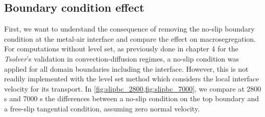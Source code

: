 
\subsection{Boundary condition effect}

First, we want to understand the consequence of removing the no-slip boundary condition at the metal-air interface and compare the effect on macrosegregation. 
For computations without level set, as previously done in chapter 4 for the \emph{Tsolver}'s validation in convection-diffusion regimes, a no-slip condition was applied for all domain boundaries including 
the interface.
However, this is not readily implemented with the level set method which considers the local interface velocity for its transport.
In \cref{fig:slipbc_2800,fig:slipbc_7000}, we compare at 2800 s and 7000 s the differences between a no-slip condition on the top boundary 
and a free-slip tangential condition, assuming zero normal velocity. 

